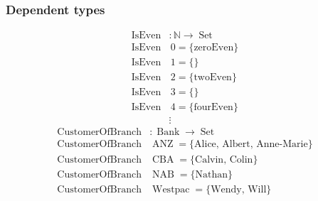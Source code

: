 \documentclass[11pt]{beamer}
\DeclareMathOperator{\Set}{Set}
\DeclareMathOperator{\ANZ}{ANZ}
\DeclareMathOperator{\NAB}{NAB}
\DeclareMathOperator{\CBA}{CBA}
\DeclareMathOperator{\Westpac}{Westpac}
\DeclareMathOperator{\Bank}{Bank}
\DeclareMathOperator{\IsEven}{IsEven}
\begin{document}
\begin{frame}
  \frametitle{Dependent types}
  \begin{align*}
    \IsEven&: \mathbb{N} \to \Set  \\
    \IsEven &\, 0 = \{ \textrm{zeroEven} \} \\
    \IsEven &\, 1 = \{ \textrm{} \} \\
    \IsEven &\, 2 = \{ \textrm{twoEven} \} \\
    \IsEven &\, 3 = \{ \textrm{} \} \\
    \IsEven &\, 4 = \{ \textrm{fourEven} \} \\
    &\vdots
  \end{align*}
  \begin{align*}
    \textrm{CustomerOfBranch}&: \Bank \to \Set  \\
    \textrm{CustomerOfBranch}& \ANZ = \{ \textrm{Alice, Albert, Anne-Marie} \} \\
    \textrm{CustomerOfBranch}& \CBA = \{ \textrm{Calvin, Colin} \} \\
    \textrm{CustomerOfBranch}& \NAB = \{ \textrm{Nathan} \} \\
    \textrm{CustomerOfBranch}& \Westpac = \{ \textrm{Wendy, Will} \} \\
  \end{align*}

\end{frame}
\end{document}
